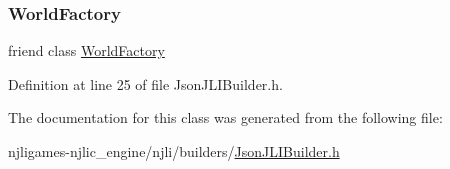\subsubsection{\texorpdfstring{World\+Factory}{WorldFactory}}
{\footnotesize\ttfamily friend class \mbox{\hyperlink{classnjli_1_1_world_factory}{World\+Factory}}\hspace{0.3cm}{\ttfamily [friend]}}



Definition at line 25 of file Json\+J\+L\+I\+Builder.\+h.



The documentation for this class was generated from the following file\+:\begin{DoxyCompactItemize}
\item 
njligames-\/njlic\+\_\+engine/njli/builders/\mbox{\hyperlink{_json_j_l_i_builder_8h}{Json\+J\+L\+I\+Builder.\+h}}\end{DoxyCompactItemize}
